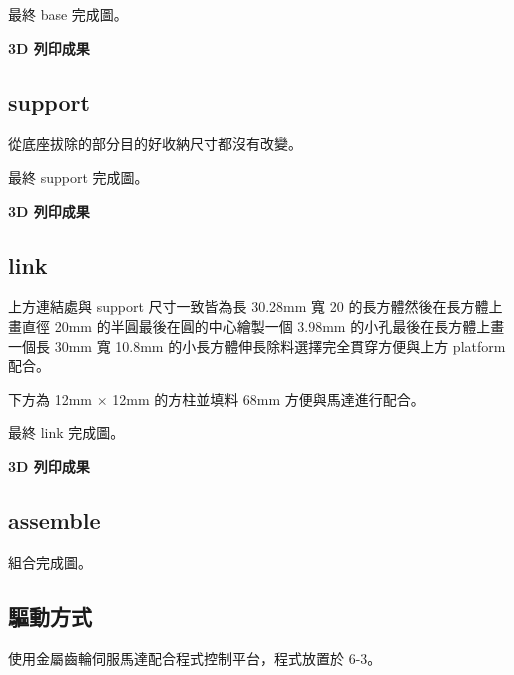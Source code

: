 最終 base 完成圖。

\textbf{3D 列印成果}

\subsection*{support}

從底座拔除的部分目的好收納尺寸都沒有改變。

最終 support 完成圖。

\textbf{3D 列印成果}

\subsection*{link}

上方連結處與 support 尺寸一致皆為長 30.28mm 寬 20 的長方體然後在長方體上畫直徑 20mm 的半圓最後在圓的中心繪製一個 3.98mm 的小孔最後在長方體上畫一個長 30mm 寬 10.8mm 的小長方體伸長除料選擇完全貫穿方便與上方 platform 配合。

下方為 12mm $\times$ 12mm 的方柱並填料 68mm 方便與馬達進行配合。

最終 link 完成圖。

\textbf{3D 列印成果}

\subsection*{assemble}

組合完成圖。

\subsection*{驅動方式}

使用金屬齒輪伺服馬達配合程式控制平台，程式放置於 6-3。



